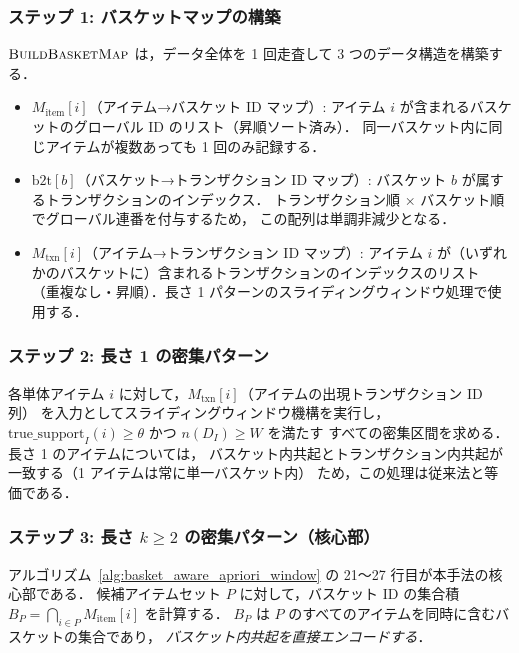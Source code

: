 

\subsubsection{ステップ 1: バスケットマップの構築}

$\Call{BuildBasketMap}{}$ は，データ全体を 1 回走査して 3 つのデータ構造を構築する．

\begin{itemize}
    \item $M_{\text{item}}[i]$（アイテム→バスケット ID マップ）:
    アイテム $i$ が含まれるバスケットのグローバル ID のリスト（昇順ソート済み）．
    同一バスケット内に同じアイテムが複数あっても 1 回のみ記録する．

    \item $\text{b2t}[b]$（バスケット→トランザクション ID マップ）:
    バスケット $b$ が属するトランザクションのインデックス．
    トランザクション順 × バスケット順でグローバル連番を付与するため，
    この配列は単調非減少となる．

    \item $M_{\text{txn}}[i]$（アイテム→トランザクション ID マップ）:
    アイテム $i$ が（いずれかのバスケットに）含まれるトランザクションのインデックスのリスト
    （重複なし・昇順）．長さ 1 パターンのスライディングウィンドウ処理で使用する．
\end{itemize}

\subsubsection{ステップ 2: 長さ 1 の密集パターン}

各単体アイテム $i$ に対して，$M_{\text{txn}}[i]$（アイテムの出現トランザクション ID 列）
を入力としてスライディングウィンドウ機構を実行し，
$\text{true\_support}_I(i) \geq \theta$ かつ $n(D_I) \geq W$ を満たす
すべての密集区間を求める．長さ 1 のアイテムについては，
バスケット内共起とトランザクション内共起が一致する（1 アイテムは常に単一バスケット内）
ため，この処理は従来法と等価である．

\subsubsection{ステップ 3: 長さ $k \geq 2$ の密集パターン（核心部）}

アルゴリズム~\ref{alg:basket_aware_apriori_window} の 21〜27 行目が本手法の核心部である．
候補アイテムセット $P$ に対して，バスケット ID の集合積
$B_P = \bigcap_{i \in P} M_{\text{item}}[i]$ を計算する．
$B_P$ は $P$ のすべてのアイテムを同時に含むバスケットの集合であり，
\emph{バスケット内共起を直接エンコードする}．


